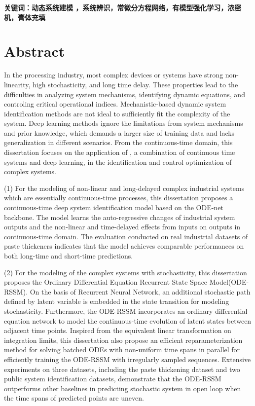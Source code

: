 \vskip 30bp
{

    \textbf{ \heiti {} 关键词：动态系统建模 ，系统辨识，常微分方程网络，有模型强化学习，浓密机，膏体充填}
}



\chapter*{ Abstract }
In the processing industry, most complex devices or systems have strong non-linearity, high stochasticity, and long time delay.
These properties lead to the difficulties in analyzing system mechanisms, identifying dynamic equations, and controling critical operational indices. 
Mechanistic-based dynamic system identification methods are not ideal to sufficiently fit the complexity of the system.
Deep learning methods ignore the limitations from system mechanisms and prior knowledge, 
which demands a larger size of training data and lacks generalization in different scenarios.
From the continuous-time domain, this dissertation focuses on the application of , a combination of continuous time systems and deep learning, in the identification and control optimization of complex systems.

(1) For the modeling of non-linear and long-delayed complex industrial systems which are essentially continuous-time processes, this dissertation proposes a continuous-time deep system identification model based on the ODE-net backbone.
The model learns the auto-regressive changes of industrial system outputs and the non-linear and time-delayed effects from inputs on outputs in continuous-time domain. 
The evaluation conducted on real industrial datasets of paste thickeners indicates that the model achieves comparable performances on both long-time and short-time predictions.   


(2) For the modeling of the complex systems with stochasticity, this dissertation proposes the  Ordinary Differential Equation Recurrent State Space Model(ODE-RSSM). 
On the basis of Recurrent Neural Network, an additional stochastic path defined by latent variable is embedded in the state transition for modeling stochasticity.
Furthermore, the ODE-RSSM incorporates an ordinary differential equation network to model the continuous-time evolution of latent states between adjacent time points.
Inspired from the equivalent linear transformation on integration limits,
this dissertation also propose an efficient reparameterization method for solving batched ODEs with non-uniform time spans in parallel for efficiently training the ODE-RSSM with irregularly sampled sequences.
Extensive experiments on three datasets, including the paste thickening dataset and two public system identification datasets, demonstrate that the ODE-RSSM outperforms other baselines in predicting stochastic system in open loop when the time spans of predicted points are uneven.


